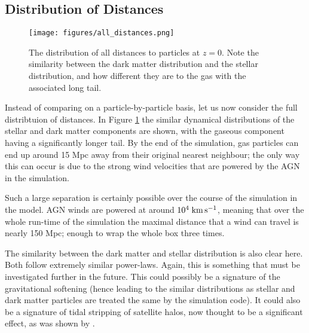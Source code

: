 \subsection{Distribution of Distances}

\begin{figure} \centering
	\texttt{[image: figures/all\_distances.png]}
	\caption{The distribution of all distances to particles at $z=0$. Note
	the similarity between the dark matter distribution and the stellar
	distribution, and how different they are to the gas with the associated
	long tail.} \label{fig:alldistances}
\end{figure}

Instead of comparing on a particle-by-particle basis, let us now consider the
full distribtuion of distances. In Figure \ref{fig:alldistances} the similar
dynamical distributions of the stellar and dark matter components are shown,
with the gaseous component having a significantly longer tail. By the end of
the simulation, gas particles can end up around 15 Mpc away from their original
nearest neighbour; the only way this can occur is due to the strong wind
velocities that are powered by the AGN in the simulation.

Such a large separation is certainly possible over the course of the simulation
in the \simba{} model. AGN winds are powered at around $10^4 \;{\rm km}\,{\rm s}^{-1}{}$, meaning
that over the whole run-time of the simulation the maximal distance that
a wind can travel is nearly 150 Mpc; enough to wrap the whole box three times.

The similarity between the dark matter and stellar distribution is also clear
here. Both follow extremely similar power-laws. Again, this is something that
must be investigated further in the future. This could possibly be a signature
of the gravitational softening (hence leading to the similar distributions as
stellar and dark matter particles are treated the same by the simulation code).
It could also be a signature of tidal stripping of satellite halos, now thought
to be a significant effect, as was shown by \citet{vandenbosch2018}.

